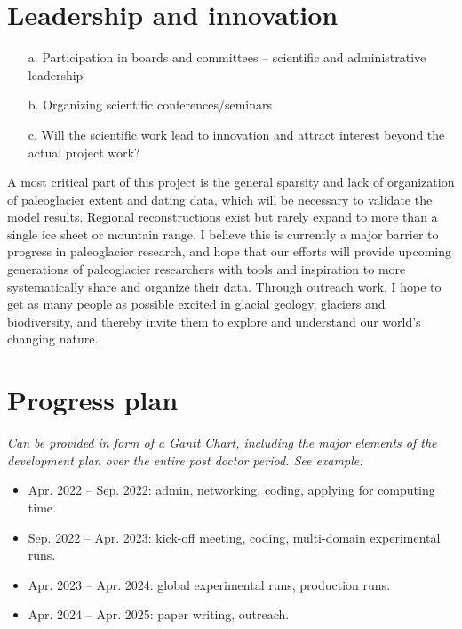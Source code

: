 \documentclass{article}
\newcommand{\guideline}[1]{{\color{color2}\itshape{#1}}}
\begin{document}
\section{Leadership and innovation}

    \guideline{
        \begin{itemize}
          \item[a.] Participation in boards and committees – scientific and
            administrative leadership
          \item[b.] Organizing scientific conferences/seminars
          \item[c.] Will the scientific work lead to innovation and attract
            interest beyond the actual project work?
        \end{itemize}}

    A most critical part of this project is the general sparsity and lack of
    organization of paleoglacier extent and dating data, which will be
    necessary to validate the model results. Regional reconstructions exist but
    rarely expand to more than a single ice sheet or mountain range. I believe
    this is currently a major barrier to progress in paleoglacier research, and
    hope that our efforts will provide upcoming generations of paleoglacier
    researchers with tools and inspiration to more systematically share and
    organize their data. Through outreach work, I hope to get as many people
    as possible excited in glacial geology, glaciers and biodiversity, and
    thereby invite them to explore and understand our world's changing nature.


\section{Progress plan}

    \guideline{
        Can be provided in form of a Gantt Chart, including the major elements
        of the development plan over the entire post doctor period. See
        example:}

    \begin{itemize}
      \item Apr. 2022 -- Sep. 2022: admin, networking, coding, applying for
        computing time.
      \item Sep. 2022 -- Apr. 2023: kick-off meeting, coding, multi-domain
        experimental runs.
      \item Apr. 2023 -- Apr. 2024: global experimental runs, production runs.
      \item Apr. 2024 -- Apr. 2025: paper writing, outreach.
    \end{itemize}
\end{document}

